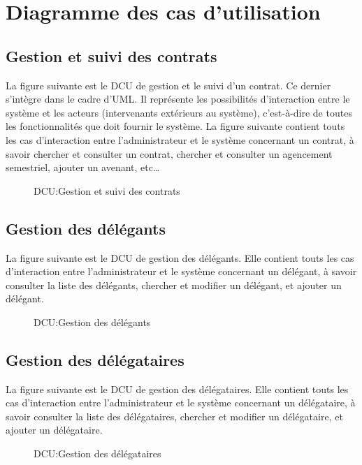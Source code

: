 	\section{Diagramme des cas d'utilisation}
	\subsection{Gestion et suivi des contrats}

	La figure suivante est le DCU de gestion et le suivi d'un contrat. Ce dernier s’intègre
	dans le cadre d'UML. Il représente les possibilités d'interaction entre le système et les acteurs
	(intervenants extérieurs au système), c'est-à-dire de toutes les fonctionnalités que doit fournir le système.
	La figure suivante contient touts les cas d'interaction entre l'administrateur et le système concernant un contrat,
	à savoir chercher et consulter un contrat, chercher et consulter un agencement semestriel,
	ajouter un avenant, etc\dots
	\begin{figure}[H]
		\begin{center}
			\caption{DCU:Gestion et suivi des contrats}
		\end{center}
	\end{figure}

	\subsection{Gestion des délégants}

	La figure suivante est le DCU de gestion des délégants.
	Elle contient touts les cas d'interaction entre l'administrateur et le système concernant un délégant,
	à savoir consulter la liste des délégants, chercher et modifier un délégant, et ajouter un délégant.
	\begin{figure}[H]
		\begin{center}
			\caption{DCU:Gestion des délégants}
		\end{center}
	\end{figure}

	\subsection{Gestion des délégataires}

	La figure suivante est le DCU de gestion des délégataires.
	Elle contient touts les cas d'interaction entre l'administrateur et le système concernant un délégataire,
	à savoir consulter la liste des délégataires, chercher et modifier un délégataire, et ajouter un délégataire.
	\begin{figure}[H]
		\begin{center}
			\caption{DCU:Gestion des délégataires}
		\end{center}
	\end{figure}

